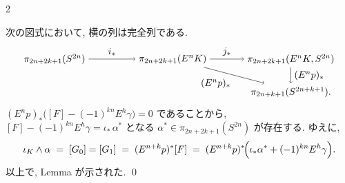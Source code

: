 \documentclass[10pt, leqno]{ltjsarticle}
\newcommand{\Ex}{E}        %
\newcommand{\pis}[2]{\pi_{#1}(#2)}       %
\numberwithin{equation}{section}
\theoremstyle{plain}
\theoremstyle{definition}
\theoremstyle{remark}
\begin{document}
\begin{paracol}{2}

次の図式において, 横の列は完全列である. 
\[
\begin{tikzpicture}[baseline=(current bounding box.center)]
  \node (A) at (0,1.2) {$\pis{2n+2k+1}{S^{2n}}$};
  \node (B) at (4.3,1.2) {$\pis{2n+2k+1}{\Ex^{n}K}$};
  \node (C) at (8.6,1.2) {$\pis{2n+2k+1}{\Ex^{n}K,S^{2n}}$};
  \node (D) at (8.6,0)   {$\pis{2n+k+1}{S^{2n+k+1}} .$};
  \draw[->] (A)--node[above] {$\ i_*\ $}(B);
  \draw[->] (B)--node[above] {$\ j_*\ $}(C);
  \draw[->] (C)--node[right] {$(\Ex^{n}p)_*\ $}(D);
  \draw[->] (B) to[right=18] node[below left] {$(E^n p)_{*}$} (D);
\end{tikzpicture}
\]
\((\Ex^{n}p)_*\bigl([F]-(-1)^{kn}\Ex^{h}\gamma\bigr)=0\) 
であることから, \\
\([F]-(-1)^{kn}\Ex^{h}\gamma=\iota_*\,\alpha^{*}\)
となる $\alpha^{*}\in\pis{2n+2k+1}{S^{2n}}$ が存在する. ゆえに,
\[
\iota_K \wedge \alpha \;=\; [G_0]
 = [G_1]\;=\; (\Ex^{n+k}p)^* [F]
\;=\;(\Ex^{n+k}p)^{*}\!\Bigl(\iota_*\alpha^{*}+(-1)^{kn}\Ex^{h}\gamma\Bigr) .
\]
以上で, Lemma が示された. 
\qed

\switchcolumn

\end{paracol}
\end{document}

